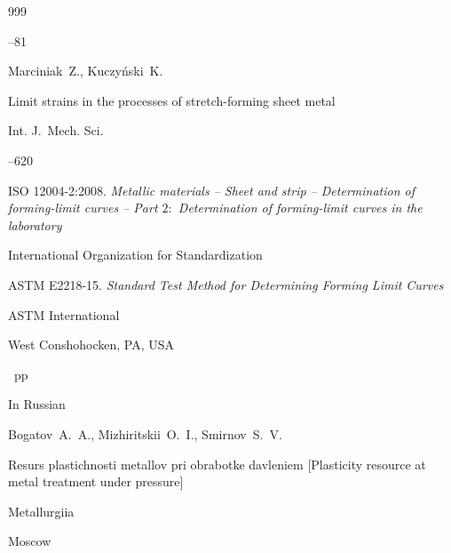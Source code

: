 \begin{thebibliography}{999}


--81




\by Marciniak~Z., Kuczy\'nski~K. 

\paper Limit strains in the processes of stretch-forming sheet metal 

\jour  Int. J.~Mech. Sci.




–620





\thesis \rm ISO 12004-2:2008. \it Metallic materials -- Sheet and strip -- Determination of forming-limit curves -- Part $2:$ Determination of forming-limit curves in the laboratory


\publaddr International Organization for Standardization






\thesis \rm ASTM E2218-15. \it  Standard Test Method for Determining Forming Limit Curves


\publ ASTM International

\publaddr West Conshohocken, PA, USA

~pp \nofrills





\lang In Russian

\by Bogatov~A.~A., Mizhiritskii~O.~I., Smirnov~S.~V.  

\book Resurs plastichnosti metallov pri obrabotke davleniem \rm [Plasticity resource at metal treatment under pressure]


\publ Metallurgiia

\publaddr Moscow





\end{thebibliography}
